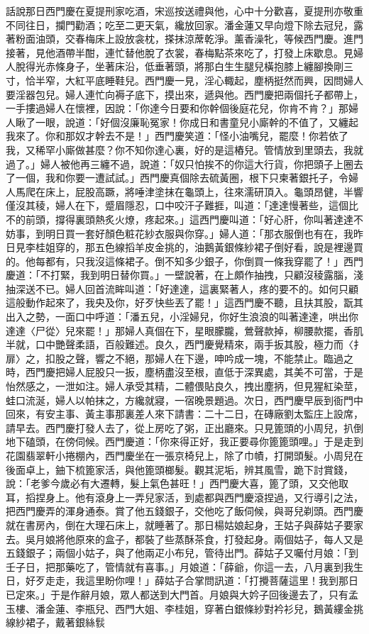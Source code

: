 \begin{showcontents}{}
話說那日西門慶在夏提刑家吃酒，宋巡按送禮與他，心中十分歡喜，夏提刑亦敬重不同往日，攔門勸酒；吃至二更天氣，纔放回家。潘金蓮又早向燈下除去冠兒，露著粉面油頭，交春梅床上設放衾枕，搽抹涼蓆乾淨。薰香澡牝，等候西門慶。進門接著，見他酒帶半酣，連忙替他脫了衣裳，春梅點茶來吃了，打發上床歇息。見婦人脫得光赤條身子，坐著床沿，低垂著頭，將那白生生腿兒橫抱膝上纏腳換剛三寸，恰半窄，大紅平底睡鞋兒。西門慶一見，淫心輙起，塵柄挺然而興，因問婦人要淫器包兒。婦人連忙向褥子底下，摸出來，遞與他。西門慶把兩個托子都帶上，一手摟過婦人在懷裡，因說：「你達今日要和你幹個後庭花兒，你肯不肯？」那婦人瞅了一眼，說道：「好個沒廉恥冤家！你成日和書童兒小廝幹的不值了，又纏起我來了。你和那奴才幹去不是！」西門慶笑道：「怪小油嘴兒，罷麼！你若依了我，又稀罕小廝做甚麼？你不知你達心裏，好的是這樁兒。管情放到里頭去，我就過了。」婦人被他再三纏不過，說道：「奴只怕挨不的你這大行貨，你把頭子上圈去了一個，我和你要一遭試試。」西門慶真個除去硫黃圈，根下只柬著銀托子，令婦人馬爬在床上，屁股高蹶，將唾津塗抹在龜頭上，往來濡研頂入。龜頭昂健，半響僅沒其稜，婦人在下，蹙眉隱忍，口中咬汗子難捱，叫道：「達達慢著些，這個比不的前頭，撐得裏頭熱炙火燎，疼起來。」這西門慶叫道：「好心肝，你叫著達達不妨事，到明日買一套好顏色粧花紗衣服與你穿。」婦人道：「那衣服倒也有在，我昨日見李桂姐穿的，那五色線搯羊皮金挑的，油鵝黃銀條紗裙子倒好看，說是裡邊買的。他每都有，只我沒這條裙子。倒不知多少銀子，你倒買一條我穿罷了！」西門慶道：「不打緊，我到明日替你買。」一壁說著，在上頗作抽拽，只顧沒稜露腦，淺抽深送不已。婦人回首流眸叫道：「好達達，這裏緊著人，疼的要不的。如何只顧這般動作起來了，我央及你，好歹快些丟了罷！」這西門慶不聽，且扶其股，翫其出入之勢，一面口中呼道：「潘五兒，小淫婦兒，你好生浪浪的叫著達達，哄出你達達〈尸從〉兒來罷！」那婦人真個在下，星眼朦朧，鶯聲款掉，柳腰款擺，香肌半就，口中艷聲柔語，百般難述。良久，西門慶覺精來，兩手扳其股，極力而〈扌扉〉之，扣股之聲，響之不絕，那婦人在下邊，呻吟成一塊，不能禁止。臨過之時，西門慶把婦人屁股只一扳，塵柄盡沒至根，直低于深異處，其美不可當，于是怡然感之，一泄如注。婦人承受其精，二體偎貼良久，拽出塵抦，但見猩紅染莖，蛙口流涎，婦人以帕抹之，方纔就寢，一宿晚景題過。次日，西門慶早辰到衙門中回來，有安主事、黃主事那裏差人來下請書：二十二日，在磚廠劉太監庄上設席，請早去。西門慶打發人去了，從上房吃了粥，正出廳來。只見篦頭的小周兒，扒倒地下磕頭，在傍伺候。西門慶道：「你來得正好，我正要尋你篦篦頭哩。」于是走到花園翡翠軒小捲棚內，西門慶坐在一張京椅兒上，除了巾幘，打開頭髮。小周兒在後面卓上，鈾下梳篦家活，與他篦頭榔髮。觀其泥垢，辨其風雪，跪下討賞錢，說：「老爹今歲必有大遷轉，髮上氣色甚旺！」西門慶大喜，篦了頭，又交他取耳，搯捏身上。他有滾身上一弄兒家活，到處都與西門慶滾捏過，又行導引之法，把西門慶弄的渾身通泰。賞了他五錢銀子，交他吃了飯伺候，與哥兒剃頭。西門慶就在書房內，倒在大理石床上，就睡著了。那日楊姑娘起身，王姑子與薛姑子要家去。吳月娘將他原來的盒子，都裝了些蒸酥茶食，打發起身。兩個姑子，每人又是五錢銀子；兩個小姑子，與了他兩疋小布兒，管待出門。薛姑子又囑付月娘：「到壬子日，把那藥吃了，管情就有喜事。」月娘道：「薛爺，你這一去，八月裏到我生日，好歹走走，我這里盼你哩！」薛姑子合掌問訊道：「打攪菩薩這里！我到那日已定來。」于是作辭月娘，眾人都送到大門首。月娘與大妗子回後邊去了，只有孟玉樓、潘金蓮、李瓶兒、西門大姐、李桂姐，穿著白銀條紗對衿衫兒，鵝黃縷金挑線紗裙子，戴著銀絲䯼
\end{showcontents}

